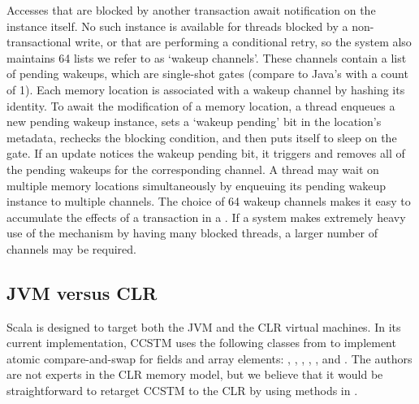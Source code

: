 Accesses that are blocked by another transaction await notification
on the  instance itself.  No such instance is available for
threads blocked by a non-transactional write, or that are performing a
conditional retry, so the system also maintains 64 lists we refer to as
`wakeup channels'.  These channels contain a list of pending wakeups,
which are single-shot gates (compare to Java's 
with a count of 1).  Each memory location is associated with a wakeup
channel by hashing its identity.  To await the modification of a
memory location, a thread enqueues a new pending wakeup instance,
sets a `wakeup pending' bit in the location's metadata, rechecks the
blocking condition, and then puts itself to sleep on the gate.  If an
update notices the wakeup pending bit, it triggers and removes all of
the pending wakeups for the corresponding channel.  A thread may wait on
multiple memory locations simultaneously by enqueuing its pending wakeup
instance to multiple channels.  The choice of 64 wakeup channels makes
it easy to accumulate the effects of a transaction in a .
If a system makes extremely heavy use of the  mechanism by
having many blocked threads, a larger number of channels may be required.

\subsection{JVM versus CLR}

Scala is designed to target both the JVM and the CLR virtual
machines.  In its current implementation, CCSTM uses the following
classes from  to implement atomic
compare-and-swap for fields and array elements: ,
, , ,
, and .
The authors are not experts in the CLR memory model, but we believe
that it would be straightforward to retarget CCSTM to the CLR by using
methods in .

